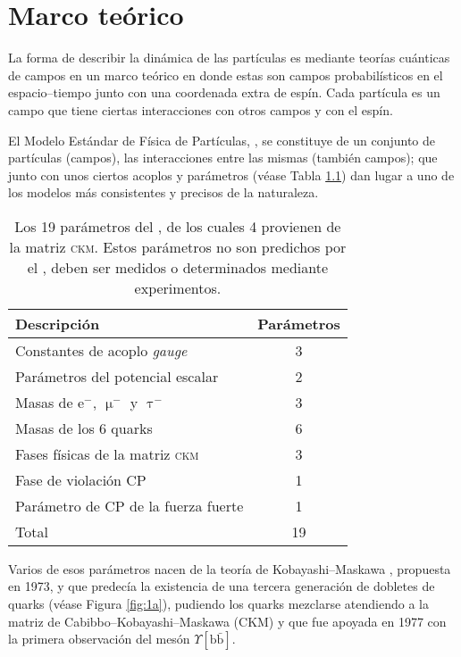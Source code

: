 \chapter{Marco teórico}
\label{cha:theo}



\color{dieg}
\color{vero} La forma de describir la dinámica \color{norm} de las partículas es mediante  teorías cuánticas de campos  en un marco teórico en donde estas son campos probabilísticos en el espacio--tiempo junto con una coordenada extra de espín.
Cada partícula es un campo que tiene ciertas interacciones con otros campos y con el espín.%
\color{norm}


El \color{vero} Modelo Estándar de Física de Partículas, \stdmod, \color{norm} se constituye de un conjunto de partículas (campos), \color{vero}las  interacciones \color{norm} entre las mismas (también campos); que junto con unos ciertos acoplos y parámetros (véase Tabla \ref{tab_stdparams}) dan lugar a uno de los modelos más consistentes y precisos de la naturaleza.

\begin{table}[H]
\centering
\begin{tabular}{lc}
\toprule
Descripción & Parámetros \\ \midrule
Constantes de acoplo \textit{\emph{gauge}} & 3\\
Parámetros del potencial escalar & 2 \\
Masas de $\mathrm{e^-}$, ${\upmu^-}$ y ${\uptau^-}$ & 3 \\
Masas de los 6 quarks & 6\\
Fases físicas de la matriz  \textsc{ckm}  & 3 \\
Fase de violación CP & 1\\
Parámetro de CP de la fuerza fuerte & 1\\ \midrule
Total & 19\\
\bottomrule
\end{tabular}
\caption{Los 19 parámetros del \stdmod, de los cuales 4 provienen de la matriz \textsc{ckm}. Estos parámetros no son predichos por el \stdmod, deben ser medidos o determinados mediante experimentos.}	\label{tab_stdparams}
\end{table}
%
\color{norm} 
%
%
Varios de esos parámetros nacen de la teoría de Kobayashi--Maskawa \cite{km1}, propuesta en 1973, y que predecía la existencia de una tercera generación de dobletes de quarks (véase Figura \ref{fig:1a}), pudiendo los quarks mezclarse atendiendo a la matriz de Cabibbo--Kobayashi--Maskawa (CKM)  y que fue \color{vero} apoyada \color{norm} en 1977 con la primera observación del mesón $\Upsilon [\mathrm{b\bar{b}}]$.
%

